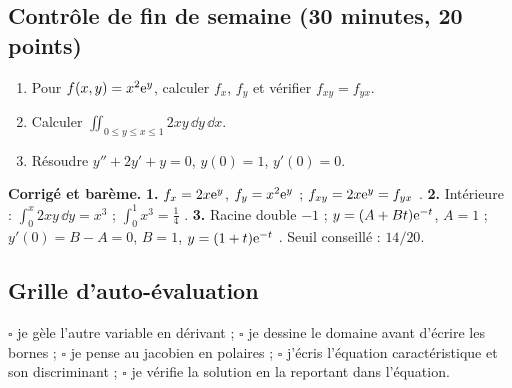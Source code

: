 \subsection{Contrôle de fin de semaine (30 minutes, 20 points)}
\begin{enumerate}
 \item {} Pour $f(x,y)=x^2\mathrm{e}^y$, calculer $f_x$, $f_y$ et vérifier $f_{xy}=f_{yx}$.
 \item {} Calculer $\iint_{0\le y\le x\le1}2xy\,\dd y\,\dd x$.
 \item {} Résoudre $y''+2y'+y=0$, $y(0)=1$, $y'(0)=0$.
\end{enumerate}
\ifcorr
\textbf{Corrigé et barème.} \textbf{1.} $f_x=2x\mathrm{e}^y$, $f_y=x^2\mathrm{e}^y$  ; $f_{xy}=2x\mathrm{e}^y=f_{yx}$ . \textbf{2.} Intérieure : $\int_0^x2xy\,\dd y=x^3$  ; $\int_0^1x^3=\frac14$ . \textbf{3.} Racine double $-1$  ; $y=(A+Bt)\mathrm{e}^{-t}$, $A=1$  ; $y'(0)=B-A=0$, $B=1$, $y=(1+t)\mathrm{e}^{-t}$ . Seuil conseillé : $14/20$.
\fi

\subsection{Grille d'auto-évaluation}
$\square$ je gèle l'autre variable en dérivant ; $\square$ je dessine le domaine avant d'écrire les bornes ; $\square$ je pense au jacobien en polaires ; $\square$ j'écris l'équation caractéristique et son discriminant ; $\square$ je vérifie la solution en la reportant dans l'équation.
